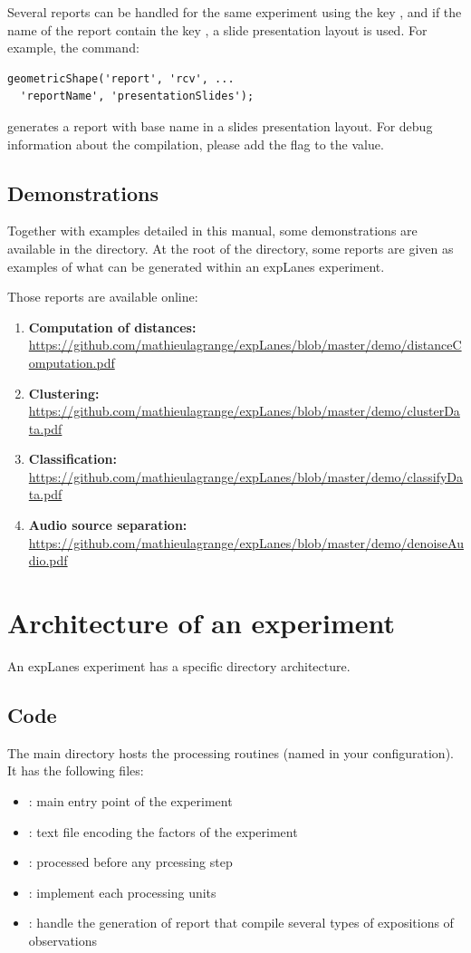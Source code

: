 \documentclass[a4paper,fleqn]{tufte-handout}
\newcommand{\explanes}{\textsf{expLanes} }
\begin{document}
Several reports can be handled for the same experiment using the key , and if the name of the report contain the key , a slide presentation layout is used. For example, the command:
\begin{lstlisting}
geometricShape('report', 'rcv', ...
  'reportName', 'presentationSlides');
\end{lstlisting} 
generates a report with base name  in a slides presentation layout. For debug information about the compilation, please add the  flag to the  value.

\subsection{Demonstrations}

Together with examples detailed in this manual, some demonstrations are available in the  directory. At the root of the directory, some reports are given as examples of what can be generated within an \explanes experiment.

Those reports are available online:
\begin{enumerate}
\item \textbf{Computation of distances: }\url{https://github.com/mathieulagrange/expLanes/blob/master/demo/distanceComputation.pdf}
\item \textbf{Clustering: }\url{https://github.com/mathieulagrange/expLanes/blob/master/demo/clusterData.pdf}
\item \textbf{Classification: }\url{https://github.com/mathieulagrange/expLanes/blob/master/demo/classifyData.pdf}
\item \textbf{Audio source separation: } \url{https://github.com/mathieulagrange/expLanes/blob/master/demo/denoiseAudio.pdf}
\end{enumerate}

\section{Architecture of an experiment}

An \explanes experiment has a specific directory architecture. 

\subsection{Code}

The main directory hosts the processing routines (named  in your configuration). It has the following files:
\begin{itemize}
\item {}: main entry point of the experiment
\item {}: text file encoding the factors of the experiment
\item {}: processed before any prcessing step
\item {}: implement each processing units
\item {}: handle the generation of report that compile several types of expositions of observations
\end{itemize}
\end{document}
